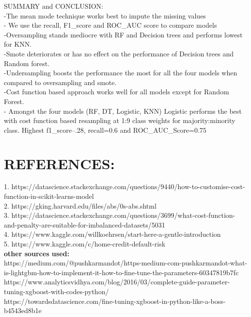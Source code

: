 \documentclass[fleqn,10pt]{SelfArx} %
\begin{document}
\begin{itemize}
SUMMARY and CONCLUSION:\\
-The mean mode technique works best to impute the missing values\\
- We use the recall, F1_score and ROC_AUC score to compare models\\
-Oversampling stands mediocre with RF and Decision trees and performs lowest for KNN.\\
-Smote deteriorates or has no effect on the performance of Decision trees and Random forest.\\
-Undersampling boosts the performance the most for all the four models when compared to oversampling and smote.\\
-Cost function based approach works well for all models except for Random Forest.\\
- Amongst the four models (RF, DT, Logistic, KNN) Logistic performs the best with cost function based resampling at 1:9 class weights for majority:minority class. Highest f1_score--.28, recall=0.6 and ROC_AUC_Score=0.75

\section{REFERENCES:}

1. https://datascience.stackexchange.com/questions/9440/how-to-customise-cost-function-in-scikit-learns-model\\
2. https://gking.harvard.edu/files/abs/0s-abs.shtml\\
3. https://datascience.stackexchange.com/questions/3699/what-cost-function-and-penalty-are-suitable-for-imbalanced-datasets/5031\\
4. https://www.kaggle.com/willkoehrsen/start-here-a-gentle-introduction\\
5. https://www.kaggle.com/c/home-credit-default-risk\\

\textbf{other sources used:}\\
 https://medium.com/@pushkarmandot/https-medium-com-pushkarmandot-what-is-lightgbm-how-to-implement-it-how-to-fine-tune-the-parameters-60347819b7fc\\
 
 https://www.analyticsvidhya.com/blog/2016/03/complete-guide-parameter-tuning-xgboost-with-codes-python/ \\
 
 https://towardsdatascience.com/fine-tuning-xgboost-in-python-like-a-boss-b4543ed8b1e\\
 

\end{itemize}
\end{document}
